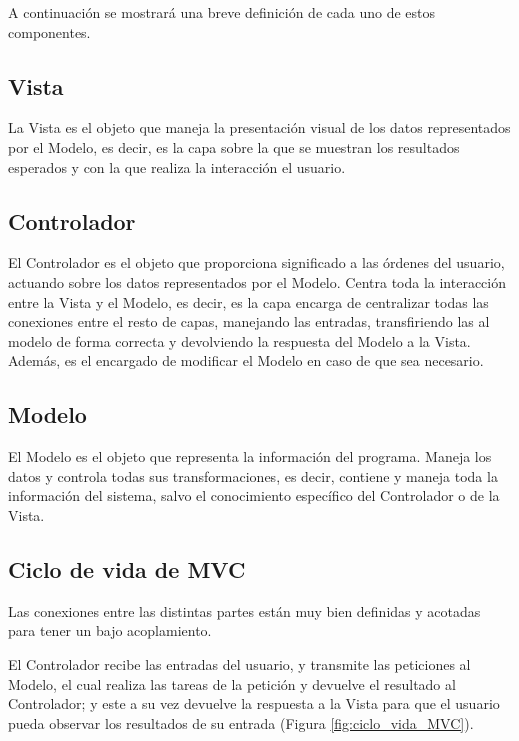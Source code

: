 A continuación se mostrará una breve definición de cada uno de estos componentes.

\subsection*{Vista}

La Vista es el objeto que maneja la presentación visual de los datos representados por el Modelo, es decir, es la capa sobre la que se muestran los resultados esperados y con la que realiza la interacción el usuario.

\subsection*{Controlador}

El Controlador es el objeto que proporciona significado a las órdenes del usuario, actuando sobre los datos representados por el Modelo. Centra toda la interacción entre la Vista y el Modelo, es decir, es la capa encarga de centralizar todas las conexiones entre el resto de capas, manejando las entradas, transfiriendo las al modelo de forma correcta y devolviendo la respuesta del Modelo a la Vista. Además, es el encargado de modificar el Modelo en caso de que sea necesario.

\subsection*{Modelo}

El Modelo es el objeto que representa la información del programa. Maneja los datos y controla todas sus transformaciones, es decir, contiene y maneja toda la información del sistema, salvo el conocimiento específico del Controlador o de la Vista.

\subsection*{Ciclo de vida de MVC}

Las conexiones entre las distintas partes están muy bien definidas y acotadas para tener un bajo acoplamiento.

El Controlador recibe las entradas del usuario, y transmite las peticiones al Modelo, el cual realiza las tareas de la petición y devuelve el resultado al Controlador; y este a su vez devuelve la respuesta a la Vista para que el usuario pueda observar los resultados de su entrada (Figura \ref{fig:ciclo_vida_MVC}).

